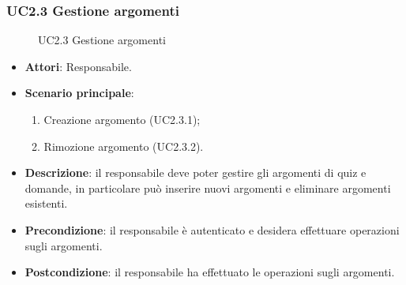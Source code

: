\subsubsection{UC2.3 Gestione argomenti}
\begin{figure}[H]
\centering
\noindent{}
\caption{UC2.3 Gestione argomenti}
\end{figure}
\begin{itemize}
\item \textbf{Attori}: Responsabile.
\item \textbf{Scenario principale}:
\begin{enumerate}
\item Creazione argomento (UC2.3.1);
\item Rimozione argomento (UC2.3.2).
\end{enumerate}
\item \textbf{Descrizione}: il responsabile  deve poter gestire gli argomenti di quiz e domande, in particolare può inserire nuovi argomenti e eliminare argomenti esistenti.
\item \textbf{Precondizione}: il responsabile è autenticato e desidera effettuare operazioni sugli argomenti.
\item \textbf{Postcondizione}: il responsabile ha effettuato le operazioni sugli argomenti.
\end{itemize}
